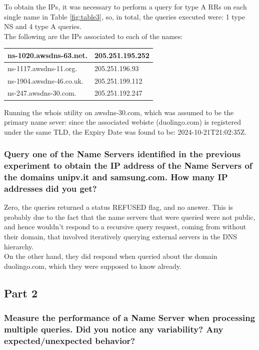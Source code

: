 \documentclass[a4paper,10pt]{article}
\begin{document}
To obtain the IPs, it was necessary to perform a query for type A RRs on each single name in Table \ref{fig:table3}, so, in total, the queries executed were: 1 type NS and 4 type A queries.\\ The following are the IPs associated to each of the names:

\begin{table}[h!]
\centering
\begin{tabular}{|l|l|}
\hline
ns-1020.awsdns-63.net.   & 205.251.195.252 \\ \hline
ns-1117.awsdns-11.org.   & 205.251.196.93  \\ \hline
ns-1904.awsdns-46.co.uk. & 205.251.199.112 \\ \hline
ns-247.awsdns-30.com.    & 205.251.192.247 \\ \hline
\end{tabular}
\end{table}

Running the whois utility on awsdns-30.com, which was assumed to be the primary name sever: since the associated webiste (duolingo.com) is registered under the same TLD, the Expiry Date was found to be: 2024-10-21T21:02:35Z.


\subsubsection{Query one of the Name Servers identified in the previous experiment to obtain the IP address of the Name Servers of the domains unipv.it and samsung.com.
How many IP addresses did you get?}

Zero, the queries returned a status REFUSED flag, and no answer. This is probably due to the fact that the name servers that were queried were not public, and hence wouldn't respond to a recursive query request, coming from without their domain, that involved iteratively querying external servers in the DNS hierarchy.\\

On the other hand, they did respond when queried about the domain duolingo.com, which they were supposed to know already.


\subsection{Part 2}


\subsubsection{Measure the performance of a Name Server when processing multiple queries. 
Did you notice any variability? Any expected/unexpected behavior?}
\end{document}
